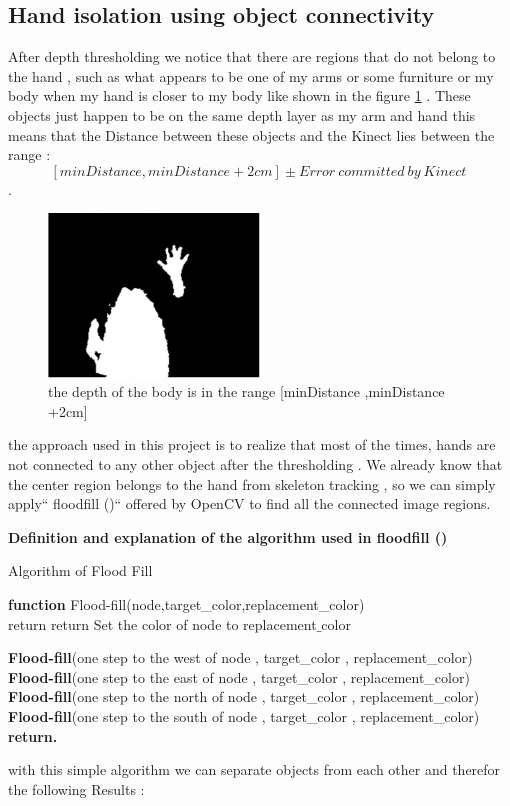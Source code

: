 \subsection{Hand isolation using object connectivity }

After depth thresholding we notice that there are regions that do not belong to the hand , such as what appears to be one of my  arms or some furniture or my body when my hand is closer to my body like shown in the figure  \ref{fig:cam10} . These objects just happen to be on the same depth layer as my arm and hand this means that the Distance between these objects and the Kinect lies  between the range : $$[minDistance ,minDistance +2cm] \pm {Error\ committed\ by\ Kinect\ } $$  .


\begin{figure}[H]
\centering
\includegraphics[width=0.5\textwidth]{img/depththresholding.png}
\caption{the depth of the body is in  the range [minDistance ,minDistance +2cm]}
\label{fig:cam10}
\end{figure}

the approach used in this project  is to realize that most of the times, hands are not connected to any other object after the thresholding . We already know that the center region belongs to the hand from skeleton tracking , so we can simply apply`` floodfill ()`` offered by OpenCV to find all the connected image regions.

\textbf{ Definition and explanation of the algorithm used in floodfill () }

\begin{algorithm}[H]

\caption{Algorithm of Flood Fill }
\textbf{function}  Flood-fill(node,target\_color,replacement\_color)\\ 
    {
     return
    }
    {
     return
    }
Set the color of node to replacement$\_$color 

\textbf{Flood-fill}(one step to the west of node , target\_color , replacement\_color)\\
\textbf{Flood-fill}(one step to the east of node , target\_color , replacement\_color)\\
\textbf{Flood-fill}(one step to the north of node , target\_color , replacement\_color)\\
\textbf{Flood-fill}(one step to the south of node , target\_color , replacement\_color)\\
\textbf{return.} 
\end{algorithm}
with this simple algorithm we can separate objects from each other and therefor the following  Results : 
 
